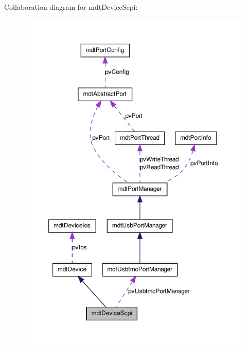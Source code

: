 Collaboration diagram for mdtDeviceScpi:\nopagebreak
\begin{figure}[H]
\begin{center}
\leavevmode
\includegraphics[width=358pt]{classmdt_device_scpi__coll__graph}
\end{center}
\end{figure}

